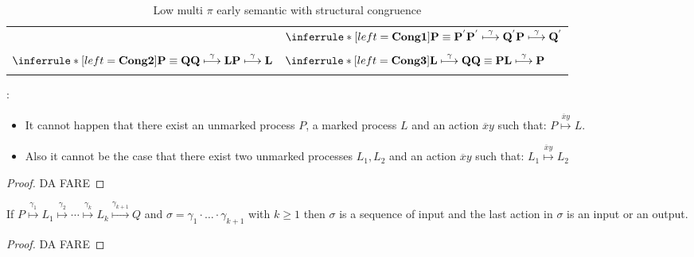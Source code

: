 \begin{definition}
\begin{table}
\begin{tabular}{ll}
	&
	  $\inferrule* [left=\bf{Cong1}]{
	      P\equiv P^{'}
	    \\
	      P^{'} \stackrel{\gamma}{\longmapsto} Q^{'}
	  }{
	      P \stackrel{\gamma}{\longmapsto} Q^{'}
	  }$
      \\\\
	  $\inferrule* [left=\bf{Cong2}]{
	      P\equiv Q
	    \\
	      Q \stackrel{\gamma}{\longmapsto} L
	  }{
	      P \stackrel{\gamma}{\longmapsto} L
	  }$
	&
	  $\inferrule* [left=\bf{Cong3}]{
	      L \stackrel{\gamma}{\longmapsto} Q
	    \\
	      Q\equiv P
	  }{
	      L \stackrel{\gamma}{\longmapsto} P
	  }$
      \\\\\hline
    \end{tabular}
    \caption{Low multi $\pi$ early semantic with structural congruence}
    \label{lowleveltransitionrelation}
  \end{table}
\end{definition}

\begin{lemma}\label{lemmacom3}
  :\begin{itemize}
    \item
      It cannot happen that there exist an unmarked process $P$, a marked process $L$ and an action $\overline{x}y$ such that: $P\stackrel{\overline{x}y}{\longmapsto}L$. 
    \item
      Also it cannot be the case that there exist two unmarked processes $L_{1}, L_{2}$ and an action $\overline{x}y$ such that: $L_{1}\stackrel{\overline{x}y}{\longmapsto}L_{2}$
  \end{itemize}
  \begin{proof}
    DA FARE
  \end{proof}
\end{lemma}

\begin{lemma}\label{lemmalabellowhigh}
  If $P\stackrel{\gamma_{1}}{\longmapsto} L_{1} \stackrel{\gamma_{2}}{\longmapsto} \cdots  \stackrel{\gamma_{k}}{\longmapsto} L_{k} \stackrel{\gamma_{k+1}}{\longmapsto} Q$ and $\sigma = \gamma_{1}\cdot \ldots \cdot \gamma_{k+1}$ with $k\geq 1$ then $\sigma$ is a sequence of input and the last action in $\sigma$ is an input or an output.
  \begin{proof}
    DA FARE
  \end{proof}
\end{lemma}

